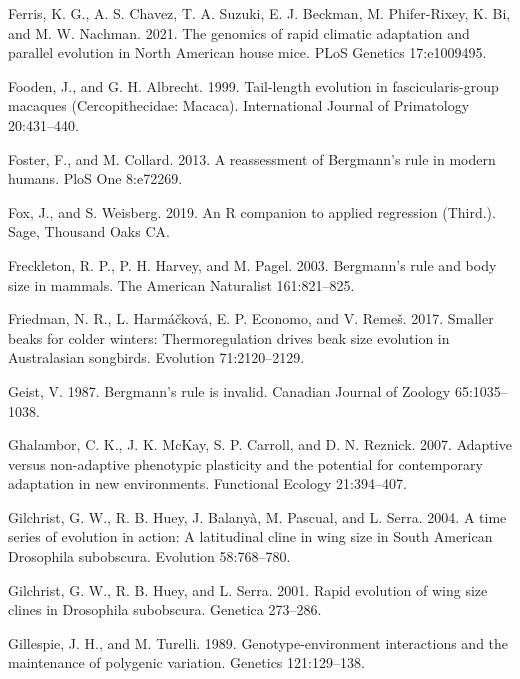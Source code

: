 \documentclass[]{article}
\begin{document}
\leavevmode\hypertarget{ref-Ferris2021}{}%
Ferris, K. G., A. S. Chavez, T. A. Suzuki, E. J. Beckman, M.
Phifer-Rixey, K. Bi, and M. W. Nachman. 2021. The genomics of rapid
climatic adaptation and parallel evolution in North American house mice.
PLoS Genetics 17:e1009495.

\leavevmode\hypertarget{ref-Fooden1999}{}%
Fooden, J., and G. H. Albrecht. 1999. Tail-length evolution in
fascicularis-group macaques (Cercopithecidae: Macaca). International
Journal of Primatology 20:431--440.

\leavevmode\hypertarget{ref-Foster2013}{}%
Foster, F., and M. Collard. 2013. A reassessment of Bergmann's rule in
modern humans. PloS One 8:e72269.

\leavevmode\hypertarget{ref-Fox2019}{}%
Fox, J., and S. Weisberg. 2019. An R companion to applied regression
(Third.). Sage, Thousand Oaks CA.

\leavevmode\hypertarget{ref-Freckleton2003}{}%
Freckleton, R. P., P. H. Harvey, and M. Pagel. 2003. Bergmann's rule and
body size in mammals. The American Naturalist 161:821--825.

\leavevmode\hypertarget{ref-Friedman2017}{}%
Friedman, N. R., L. Harmáčková, E. P. Economo, and V. Remeš. 2017.
Smaller beaks for colder winters: Thermoregulation drives beak size
evolution in Australasian songbirds. Evolution 71:2120--2129.

\leavevmode\hypertarget{ref-Geist1987}{}%
Geist, V. 1987. Bergmann's rule is invalid. Canadian Journal of Zoology
65:1035--1038.

\leavevmode\hypertarget{ref-Ghalambor2007}{}%
Ghalambor, C. K., J. K. McKay, S. P. Carroll, and D. N. Reznick. 2007.
Adaptive versus non-adaptive phenotypic plasticity and the potential for
contemporary adaptation in new environments. Functional Ecology
21:394--407.

\leavevmode\hypertarget{ref-Gilchrist2004a}{}%
Gilchrist, G. W., R. B. Huey, J. Balanyà, M. Pascual, and L. Serra.
2004. A time series of evolution in action: A latitudinal cline in wing
size in South American Drosophila subobscura. Evolution 58:768--780.

\leavevmode\hypertarget{ref-Gilchrist2001}{}%
Gilchrist, G. W., R. B. Huey, and L. Serra. 2001. Rapid evolution of
wing size clines in Drosophila subobscura. Genetica 273--286.

\leavevmode\hypertarget{ref-Gillespie1989}{}%
Gillespie, J. H., and M. Turelli. 1989. Genotype-environment
interactions and the maintenance of polygenic variation. Genetics
121:129--138.
\end{document}
